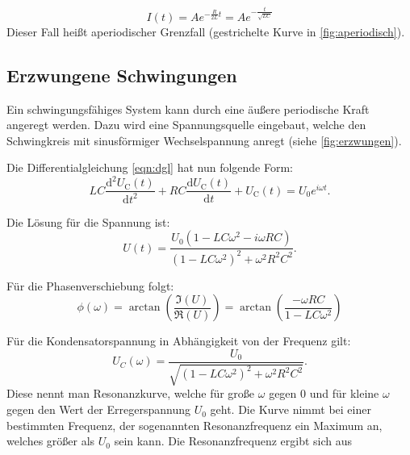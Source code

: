 \begin{equation}
  I(t) = A e^{-\frac{R}{2L}t} = A e^{-\frac{t}{\sqrt{LC}}}
\end{equation}
Dieser Fall heißt aperiodischer Grenzfall (gestrichelte Kurve in \ref{fig:aperiodisch}).

\subsection{Erzwungene Schwingungen}
Ein schwingungsfähiges System kann durch eine äußere periodische Kraft angeregt werden. Dazu wird eine Spannungsquelle eingebaut, welche den Schwingkreis mit sinusförmiger Wechselspannung anregt (siehe \ref{fig:erzwungen}).


Die Differentialgleichung \ref{eqn:dgl} hat nun folgende Form:
\begin{equation}
  LC \frac{\mathrm{d}^2 U_{\mathrm C}(t)}{\mathrm{d}t^2} + RC \frac{\mathrm{d}U_{\mathrm C}(t)}{\mathrm{d}t} + U_{\mathrm C}(t) = U_0 e^{i\omega t}.
\end{equation}

Die Lösung für die Spannung ist:
\begin{equation}
  U(t) = \frac{U_0(1-LC\omega^2 - i\omega RC)}{(1 - LC\omega^2)^2 + \omega^2 R^2 C^2}.
\end{equation}

Für die Phasenverschiebung folgt:
\begin{equation}
  \phi(\omega) = \arctan \left(\frac{\Im(U)}{\Re(U)}\right) = \arctan \left(\frac{-\omega RC}{1 - LC\omega^2}\right)
\end{equation}

Für die Kondensatorspannung in Abhängigkeit von der Frequenz gilt:
\begin{equation}
\label{eqn:resonanz}
U_C(\omega) = \frac{U_0}{\sqrt{\left(1 - LC\omega^2 \right)^2 + \omega^2R^2C^2}}.
\end{equation}
Diese nennt man Resonanzkurve, welche für große $\omega$ gegen 0 und für kleine $\omega$ gegen den Wert der Erregerspannung $U_0$ geht. Die Kurve nimmt bei einer bestimmten Frequenz, der sogenannten Resonanzfrequenz ein Maximum an, welches größer als $U_0$ sein kann. Die Resonanzfrequenz ergibt sich aus

